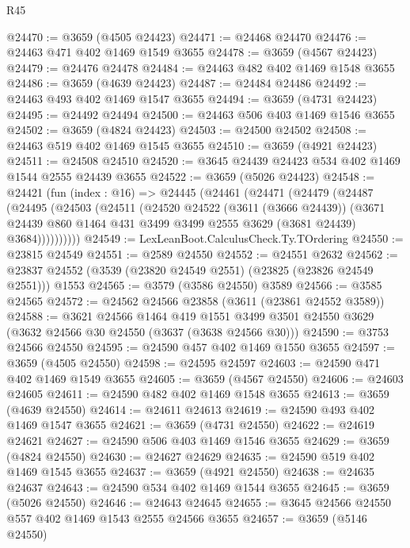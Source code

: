 \begin{lexlean}{R45}
\begin{coremodule}
@24470 := @3659 (@4505 @24423)
@24471 := @24468 @24470
@24476 := @24463 @471 @402 @1469 @1549 @3655
@24478 := @3659 (@4567 @24423)
@24479 := @24476 @24478
@24484 := @24463 @482 @402 @1469 @1548 @3655
@24486 := @3659 (@4639 @24423)
@24487 := @24484 @24486
@24492 := @24463 @493 @402 @1469 @1547 @3655
@24494 := @3659 (@4731 @24423)
@24495 := @24492 @24494
@24500 := @24463 @506 @403 @1469 @1546 @3655
@24502 := @3659 (@4824 @24423)
@24503 := @24500 @24502
@24508 := @24463 @519 @402 @1469 @1545 @3655
@24510 := @3659 (@4921 @24423)
@24511 := @24508 @24510
@24520 := @3645 @24439 @24423 @534 @402 @1469 @1544 @2555 @24439 @3655
@24522 := @3659 (@5026 @24423)
@24548 := @24421
    (fun (index : @16) =>
    @24445
      (@24461
        (@24471
          (@24479
            (@24487
              (@24495
                (@24503
                  (@24511
                    (@24520
                      @24522
                      (@3611 (@3666 @24439))
                      (@3671
                        @24439
                        @860
                        @1464
                        @431
                        @3499
                        @3499
                        @2555
                        @3629
                        (@3681 @24439)
                        @3684))))))))))
@24549 := LexLeanBoot.CalculusCheck.Ty.TOrdering
@24550 := @23815 @24549
@24551 := @2589 @24550
@24552 := @24551 @2632
@24562 := @23837 @24552 (@3539 (@23820 @24549 @2551) (@23825 (@23826 @24549 @2551))) @1553
@24565 := @3579 (@3586 @24550) @3589
@24566 := @3585 @24565
@24572 := @24562 @24566 @23858 (@3611 (@23861 @24552 @3589))
@24588 := @3621
    @24566
    @1464
    @419
    @1551
    @3499
    @3501
    @24550
    @3629
    (@3632 @24566 @30 @24550 (@3637 (@3638 @24566 @30)))
@24590 := @3753 @24566 @24550
@24595 := @24590 @457 @402 @1469 @1550 @3655
@24597 := @3659 (@4505 @24550)
@24598 := @24595 @24597
@24603 := @24590 @471 @402 @1469 @1549 @3655
@24605 := @3659 (@4567 @24550)
@24606 := @24603 @24605
@24611 := @24590 @482 @402 @1469 @1548 @3655
@24613 := @3659 (@4639 @24550)
@24614 := @24611 @24613
@24619 := @24590 @493 @402 @1469 @1547 @3655
@24621 := @3659 (@4731 @24550)
@24622 := @24619 @24621
@24627 := @24590 @506 @403 @1469 @1546 @3655
@24629 := @3659 (@4824 @24550)
@24630 := @24627 @24629
@24635 := @24590 @519 @402 @1469 @1545 @3655
@24637 := @3659 (@4921 @24550)
@24638 := @24635 @24637
@24643 := @24590 @534 @402 @1469 @1544 @3655
@24645 := @3659 (@5026 @24550)
@24646 := @24643 @24645
@24655 := @3645 @24566 @24550 @557 @402 @1469 @1543 @2555 @24566 @3655
@24657 := @3659 (@5146 @24550)

\end{coremodule}
\end{lexlean}
